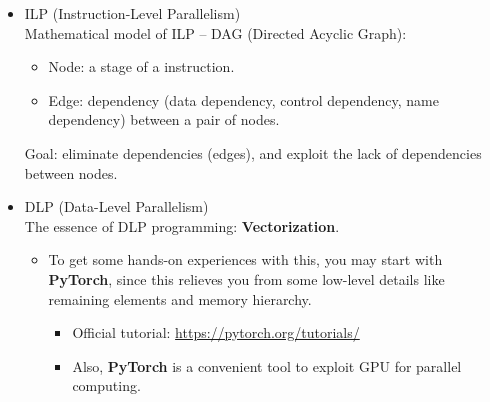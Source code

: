 \documentclass{article}
\begin{document}
\begin{itemize}
    \item ILP (Instruction-Level Parallelism)\\
    Mathematical model of ILP -- DAG (Directed Acyclic Graph):
    \begin{itemize}
        \item Node: a stage of a instruction.
        \item Edge: dependency (data dependency, control dependency, name dependency) between a pair of nodes.
    \end{itemize}
    Goal:
    eliminate dependencies (edges), and exploit the lack of dependencies between nodes.
    \item DLP (Data-Level Parallelism)\\
        The essence of DLP programming: \textbf{Vectorization}.
        \begin{itemize}
            \item To get some hands-on experiences with this, you may start with \textbf{PyTorch}, since this relieves you from some low-level details like remaining elements and memory hierarchy.
            \begin{itemize}
                \item Official tutorial: \href{https://pytorch.org/tutorials/}{https://pytorch.org/tutorials/}
                \item Also, \textbf{PyTorch} is a convenient tool to exploit GPU for parallel computing.
            \end{itemize}
        \end{itemize}
        

\end{itemize}
\end{document}

